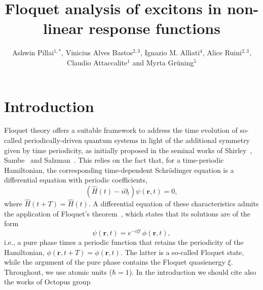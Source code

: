 \documentclass{iopjournal}
\begin{document}

\title{Floquet analysis of excitons in non-linear response functions}

\author{Ashwin Pillai$^{1,*}$, Vinicius Alves Bastos$^{2,3}$, Ignazio M. Alliati$^4$, Alice Ruini$^{2,3}$, Claudio Attaccalite$^{1}$ and Myrta Gr\"uning$^{5}$}





\begin{abstract}
\end{abstract}

\section{Introduction}

Floquet theory offers a suitable framework to address the time evolution of so-called
periodically-driven quantum systems in light of the additional symmetry given by time
periodicity, as initially proposed in the seminal works of Shirley~\cite{Shirley1965},
Sambe~\cite{Sambe1973} and Salzman~\cite{Salzman1973}. This relies on the fact that, for a
time-periodic Hamiltonian, the corresponding time-dependent Schr\"odinger equation is a
differential equation with periodic coefficients,
\begin{equation}
  \left(\hat H(t) - i\partial_t\right)\psi(\mathbf r,t) = 0,
  \label{eq:tdse}
\end{equation}
where $\hat H(t+T)=\hat H(t)$. A differential equation of these characteristics admits the
application of Floquet's theorem~\cite{Floquet1883}, which states that its solutions are of the form
\begin{equation}
  \psi(\mathbf r,t) = e^{-i\xi t}\,\phi(\mathbf r,t),
  \label{eq:floquet_theorem}
\end{equation}
i.e., a pure phase times a periodic function that retains the periodicity of the Hamiltonian,
$\phi(\mathbf r,t+T)=\phi(\mathbf r,t)$. The latter is a so-called Floquet state, while the
argument of the pure phase contains the Floquet quasienergy $\xi$. Throughout, we use atomic
units ($\hbar=1$).
In the introduction we should cite also the works of Octopus group\cite{giovannini2020floquet,li2026firstprinciplesfloquetanalysisrealtime}
\end{document}
